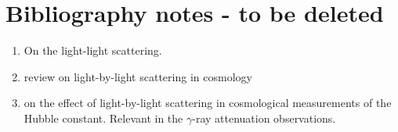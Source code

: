 \chapter{Bibliography notes - to be deleted}
\begin{enumerate}
\item \cite{Eule1935} On the light-light scattering. 
\item \cite{Fran2021} review on light-by-light scattering in cosmology
\item \cite{Domí2019} on the effect of light-by-light scattering in cosmological measurements of the Hubble constant. Relevant in the $\gamma$-ray attenuation observations.
\end{enumerate}
